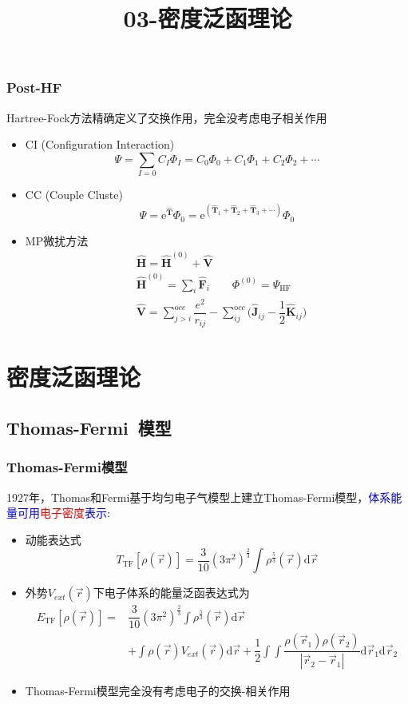 \frame
{
	\frametitle{\textrm{Post-HF}}
	\textrm{Hartree-Fock}方法精确定义了交换作用，完全没考虑电子相关作用
	\begin{itemize}
		\item \textrm{CI (Configuration Interaction)}
	$$\Psi=\sum_{I=0}C_I\Phi_I=C_0\Phi_0+C_1\Phi_1+C_2\Phi_2+\cdots$$
		\item \textrm{CC (Couple Cluste)}\\
			\begin{displaymath}
				\Psi=\mathrm{e}^{\hat{\mathbf T}}\Phi_0=\mathrm{e}^{(\hat{\mathbf T}_1+\hat{\mathbf T}_2+\hat{\mathbf T}_3+\cdots)}\Phi_0
			\end{displaymath}
		\item \textrm{MP}微扰方法
			\begin{displaymath}
				\begin{aligned}
					&\hat{\mathbf H}=\hat{\mathbf H}^{(0)}+\hat{\mathbf V} \\
					&\hat{\mathbf H}^{(0)}=\sum_i\hat{\mathbf F}_i \qquad \Phi^{(0)}=\Psi_{\mathrm{HF}}\\ 
					&\hat{\mathbf V}=\sum_{j>i}^{\mathrm occ}\dfrac{e^2}{r_{ij}}-\sum_{ij}^{\mathrm occ}\big(\hat{\mathbf J}_{ij}-\dfrac12\hat{\mathbf K}_{ij}\big)
				\end{aligned}
			\end{displaymath}
	\end{itemize}
}

\title{03-密度泛函理论}
\section{密度泛函理论}       %
\subsection{\rm{Thomas-Fermi~}模型}       %
\frame
{
	\frametitle{\textrm{Thomas-Fermi}模型} 
	\textrm{1927}年，\textrm{Thomas}和\textrm{Fermi}基于均匀电子气模型上建立\textrm{Thomas-Fermi}模型，\textcolor{blue}{体系能量可用}\textcolor{red}{电子密度}\textcolor{blue}{表示}:
	\begin{itemize}
		\item 动能表达式
			$$T_{\mathrm{TF}}[\rho(\vec r)]=\dfrac3{10}(3\pi^2)^{\frac23}\int\rho^{\frac53}(\vec r)\mathrm{d}\vec r$$
		\item 外势$V_{ext}(\vec r)$下电子体系的能量泛函表达式为
			\begin{displaymath}
				\begin{aligned}
					E_{\mathrm{TF}}[\rho(\vec r)]=&\dfrac3{10}(3\pi^2)^{\frac23}\int\rho^{\frac53}(\vec r)\mathrm{d}\vec r\\
					&+\int\rho(\vec r)V_{ext}(\vec r)\mathrm{d}\vec r+\dfrac12\int\int\dfrac{\rho(\vec r_1)\rho(\vec r_2)}{|\vec r_2-\vec r_1|}\mathrm{d}\vec r_1\mathrm{d}\vec r_2
				\end{aligned}
			\end{displaymath}
		\item \textrm{Thomas-Fermi}模型完全没有考虑电子的交换-相关作用
	\end{itemize}
}

